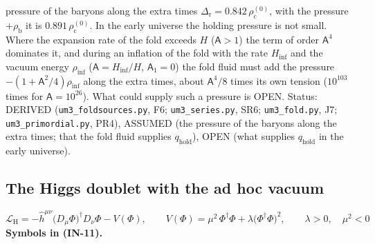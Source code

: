 \documentclass[
  10pt,
]{article}
\begin{document}
pressure of the baryons along the extra times
\(\Delta_{\mathrm{r}} = 0.842\,\rho_{\mathrm{c}}^{(0)}\), with the
pressure \(+\rho_{\mathrm{b}}\) it is
\(0.891\,\rho_{\mathrm{c}}^{(0)}\). In the early universe the holding
pressure is not small. Where the expansion rate of the fold exceeds
\(H\) (\(\mathsf{A} > 1\)) the term of order \(\mathsf{A}^4\) dominates
it, and during an inflation of the fold with the rate
\(H_{\mathrm{inf}}\) and the vacuum energy \(\rho_{\mathrm{inf}}\)
(\(\mathsf{A} = H_{\mathrm{inf}}/H\), \(\mathsf{A}_1 = 0\)) the fold
fluid must add the pressure \(-(1 + \mathsf{A}^2/4)\rho_{\mathrm{inf}}\)
along the extra times, about \(\mathsf{A}^4/8\) times its own tension
(\(10^{103}\) times for \(\mathsf{A} = 10^{26}\)). What could supply
such a pressure is OPEN. Status: DERIVED (\texttt{um3\_foldsources.py},
F6; \texttt{um3\_series.py}, SR6; \texttt{um3\_fold.py}, J7;
\texttt{um3\_primordial.py}, PR4), ASSUMED (the pressure of the baryons
along the extra times; that the fold fluid supplies
\(q_{\mathrm{hold}}\)), OPEN (what supplies \(q_{\mathrm{hold}}\) in the
early universe).

\hypertarget{the-higgs-doublet-with-the-ad-hoc-vacuum}{%
\subsection{The Higgs doublet with the ad hoc
vacuum}\label{the-higgs-doublet-with-the-ad-hoc-vacuum}}

\[
\mathcal{L}_{\mathrm{H}} = -\hat h^{\mu\nu}\big(D_\mu\Phi\big)^\dagger D_\nu\Phi - V(\Phi),\qquad
V(\Phi) = \mu^2\,\Phi^\dagger\Phi + \lambda\big(\Phi^\dagger\Phi\big)^2,\qquad \lambda > 0,\quad \mu^2 < 0 \tag{IN-11}
\] \textbf{Symbols in (IN-11).}
\end{document}
